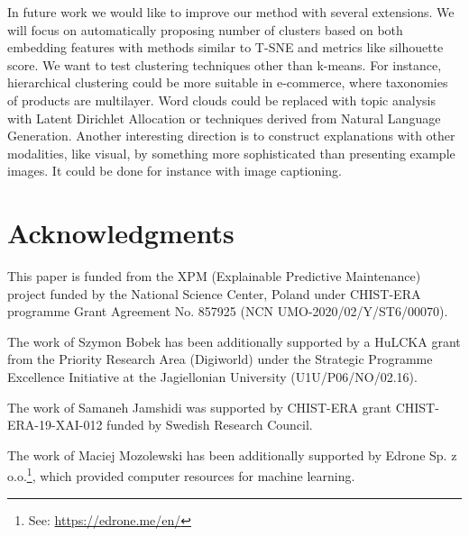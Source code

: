 \documentclass{article}
\begin{document}

In future work we would like to improve our method with several extensions.
We will focus on automatically proposing number of clusters based on both embedding features with methods similar to T-SNE and metrics like silhouette score.
We want to test clustering techniques other than k-means.
For instance, hierarchical clustering could be more suitable in e-commerce, where taxonomies of products are multilayer.
Word clouds could be replaced with topic analysis with Latent Dirichlet Allocation or techniques derived from Natural Language Generation.
Another interesting direction is to construct explanations with other modalities, like visual, by something more sophisticated than presenting example images.
It could be done for instance with image captioning.

\section*{Acknowledgments}
This paper is funded from the XPM (Explainable Predictive Maintenance) project funded by the National Science Center, Poland under CHIST-ERA programme Grant Agreement No. 857925 (NCN UMO-2020/02/Y/ST6/00070).

The work of Szymon Bobek has been additionally supported by a HuLCKA grant from the Priority Research Area (Digiworld) under the Strategic Programme Excellence Initiative at the Jagiellonian University (U1U/P06/NO/02.16).

The work of Samaneh Jamshidi was supported by CHIST-ERA grant CHIST-ERA-19-XAI-012 funded by Swedish Research Council.

The work of Maciej Mozolewski has been additionally supported by Edrone Sp. z o.o.\footnote{See: \url{https://edrone.me/en/}}, which provided computer resources for machine learning.




\end{document}

